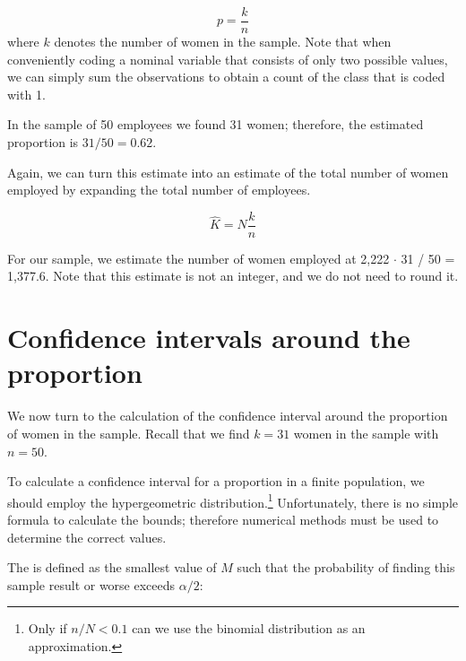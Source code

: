 \begin{equation}
  p = \frac{k}{n}
  \label{eq:sample_proportion}
\end{equation}
where $k$ denotes the number of women in the sample. Note that when conveniently coding a nominal variable that consists of only two possible values, we can simply sum the observations to obtain a count of the class that is coded with 1.

In the sample of 50 employees we found 31 women; therefore, the estimated proportion is $31 / 50 = 0.62$.

Again, we can turn this estimate into an estimate of the total number of women employed by expanding the total number of employees.

\begin{equation}
  \hat{K} = N \frac{k}{n}
  \label{eq:point_estimate_number}
\end{equation}

For our sample, we estimate the number of women employed at 2,222 $\cdot$ 31 / 50 = 1,377.6. Note that this estimate is not an integer, and we do not need to round it.



\section{Confidence intervals around the proportion} %
\label{sec:confidence_intervals_around_the_proportion}

We now turn to the calculation of the confidence interval around the proportion of women in the sample. Recall that we find $k = 31$ women in the sample with $n = 50$. 

To calculate a confidence interval for a proportion in a finite population, we should employ the hypergeometric distribution.\footnote{Only if $n / N < 0.1$ can we use the binomial distribution as an approximation.} Unfortunately, there is no simple formula to calculate the bounds; therefore numerical methods must be used to determine the correct values.

The  is defined as the smallest value of $M$ such that the probability of finding this sample result or worse exceeds $\alpha/2$:

